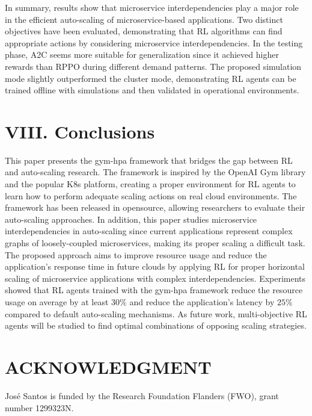 \documentclass[10pt]{article}
\begin{document}
In summary, results show that microservice interdependencies play a major role in the efficient auto-scaling of microservice-based applications. Two distinct objectives have been evaluated, demonstrating that RL algorithms can find appropriate actions by considering microservice interdependencies. In the testing phase, A2C seems more suitable for generalization since it achieved higher rewards than RPPO during different demand patterns. The proposed simulation mode slightly outperformed the cluster mode, demonstrating RL agents can be trained offline with simulations and then validated in operational environments.

\section*{VIII. Conclusions}
This paper presents the gym-hpa framework that bridges the gap between RL and auto-scaling research. The framework is inspired by the OpenAI Gym library and the popular K8s platform, creating a proper environment for RL agents to learn how to perform adequate scaling actions on real cloud environments. The framework has been released in opensource, allowing researchers to evaluate their auto-scaling approaches. In addition, this paper studies microservice interdependencies in auto-scaling since current applications represent complex graphs of loosely-coupled microservices, making its proper scaling a difficult task. The proposed approach aims to improve resource usage and reduce the application's response time in future clouds by applying RL for proper horizontal scaling of microservice applications with complex interdependencies. Experiments showed that RL agents trained with the gym-hpa framework reduce the resource usage on average by at least $30 \%$ and reduce the application's latency by $25 \%$ compared to default auto-scaling mechanisms. As future work, multi-objective RL agents will be studied to find optimal combinations of opposing scaling strategies.

\section*{ACKNOWLEDGMENT}
José Santos is funded by the Research Foundation Flanders (FWO), grant number 1299323N.
\end{document}

